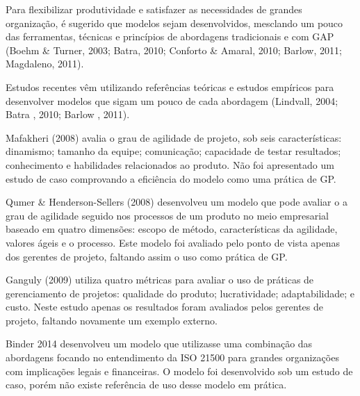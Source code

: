 Para flexibilizar produtividade e satisfazer as necessidades de grandes organização, é sugerido que modelos sejam desenvolvidos, mesclando um pouco das ferramentas, técnicas e princípios de abordagens tradicionais e com GAP (Boehm \& Turner, 2003; Batra, 2010; Conforto \& Amaral, 2010; Barlow, 2011; Magdaleno, 2011).

Estudos recentes vêm utilizando referências teóricas e estudos empíricos para desenvolver modelos que sigam um pouco de cada abordagem (Lindvall, 2004; Batra , 2010; Barlow , 2011).

Mafakheri (2008) avalia o grau de agilidade de projeto, sob seis características: dinamismo; tamanho da equipe; comunicação; capacidade de testar resultados; conhecimento e habilidades relacionados ao produto. Não foi apresentado um estudo de caso comprovando a eficiência do modelo como uma prática de GP.

Qumer \& Henderson-Sellers (2008) desenvolveu um modelo que pode avaliar o a grau de agilidade seguido nos processos de um produto no meio empresarial baseado em quatro dimensões: escopo de método, características da agilidade, valores ágeis e o processo. Este modelo foi avaliado pelo ponto de vista apenas dos gerentes de projeto, faltando assim o uso como prática de GP.

Ganguly (2009) utiliza quatro métricas para avaliar o uso de práticas de gerenciamento de projetos: qualidade do produto; lucratividade; adaptabilidade; e custo. Neste estudo apenas os resultados foram avaliados pelos gerentes de projeto, faltando novamente um exemplo externo.

Binder 2014 desenvolveu um modelo que utilizasse uma combinação das abordagens focando no entendimento da ISO 21500 para grandes organizações com implicações legais e financeiras. O modelo foi desenvolvido sob um estudo de caso, porém não existe referência de uso desse modelo em prática.

